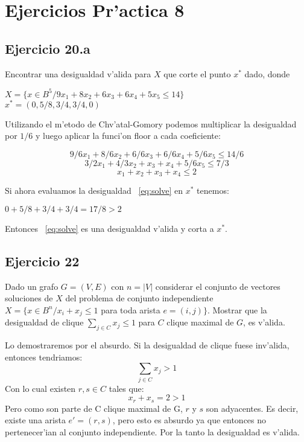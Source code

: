 \section{Ejercicios Pr'actica 8}
\subsection{Ejercicio 20.a}
Encontrar una desigualdad v'alida para $X$ que corte el punto $x^{*}$ dado, donde
\begin{center}
$X = \{x \in B^{5} / 9x_1 + 8x_2 + 6x_3 + 6x_4 + 5x_5 \leq 14\}$ \\
$x^{*} = (0, 5/8, 3/4, 3/4, 0)$
\end{center}
Utilizando el m'etodo de Chv'atal-Gomory podemos multiplicar la desigualdad por $1/6$ y luego aplicar la funci'on floor a cada coeficiente:
\begin{center}
\begin{equation}
9/6 x_1 + 8/6 x_2 + 6/6 x_3 + 6/6 x_4 + 5/6 x_5 \leq 14/6
\end{equation}
\begin{equation}
3/2 x_1 + 4/3 x_2 + x_3 + x_4 + 5/6 x_5 \leq 7/3
\end{equation}
\begin{equation} \label{eq:solve}
x_1 + x_2 + x_3 + x_4 \leq 2
\end{equation}
\end{center}
Si ahora evaluamos la desigualdad ~\ref{eq:solve} en $x^{*}$ tenemos:
\begin{center}
$0 + 5/8 + 3/4 + 3/4 = 17/8 > 2$
\end{center}
Entonces ~\ref{eq:solve} es una desigualdad v'alida y corta a $x^{*}$.

\subsection{Ejercicio 22}
Dado un grafo $G = (V, E)$ con $n = |V|$ considerar el conjunto de vectores soluciones de $X$ del
problema de conjunto independiente $X = \{ x\in B^{n}/ x_{i}+x_{j}\leq 1$ para toda arista $e =(i,j) \}$. Mostrar que la desigualdad de clique $\sum_{j\in C} x_{j} \leq 1$ para $C$ clique maximal de $G$, es v'alida. 

Lo demostraremos por el absurdo. Si la desigualdad de clique fuese inv'alida, entonces tendriamos:
\begin{equation}
\sum_{j\in C} x_{j} > 1
\end{equation}
 Con lo cual existen $r, s \in C$  tales que:
\begin{equation}
x_{r} + x_{s} = 2 > 1
\end{equation}
Pero como son parte de C clique maximal de G, $r$ y $s$ son adyacentes. Es decir, existe una arista $e' = (r,s)$, pero esto es absurdo ya que entonces no pertenecer'ian al conjunto independiente.
Por la tanto la desigualdad es v'alida.